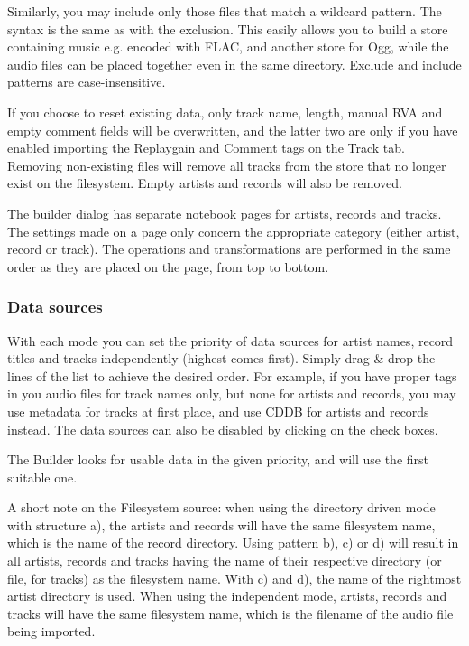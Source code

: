 \documentclass[10pt,english]{article}
\begin{document}
Similarly, you may include only those files that match a
wildcard pattern. The syntax is the same as with the
exclusion. This easily allows you to build a store containing
music e.g. encoded with FLAC, and another store for Ogg, while
the audio files can be placed together even in the same
directory. Exclude and include patterns are
case-insensitive.




If you choose to reset existing data, only track name,
length, manual RVA and empty comment fields will be
overwritten, and the latter two are only if you have enabled
importing the Replaygain and Comment tags on the Track
tab. Removing non-existing files will remove all tracks from
the store that no longer exist on the filesystem. Empty
artists and records will also be removed.




The builder dialog has separate notebook pages for artists,
records and tracks. The settings made on a page only concern
the appropriate category (either artist, record or track). The
operations and transformations are performed in the same order
as they are placed on the page, from top to bottom.


\subsubsection{Data sources\label{idp681344}}



\noindent With each mode you can set the priority of data sources
for artist names, record titles and tracks independently
(highest comes first). Simply drag \& drop the lines of
the list to achieve the desired order. For example, if you
have proper tags in you audio files for track names only,
but none for artists and records, you may use metadata for
tracks at first place, and use CDDB for artists and records
instead. The data sources can also be disabled by clicking
on the check boxes.




The Builder looks for usable data in the given priority,
and will use the first suitable one.




A short note on the Filesystem source: when using the
directory driven mode with structure a), the artists and
records will have the same filesystem name, which is the
name of the record directory. Using pattern b), c) or d)
will result in all artists, records and tracks having the
name of their respective directory (or file, for tracks) as
the filesystem name. With c) and d), the name of the
rightmost artist directory is used. When using the
independent mode, artists, records and tracks will have the
same filesystem name, which is the filename of the audio
file being imported.
\end{document}
